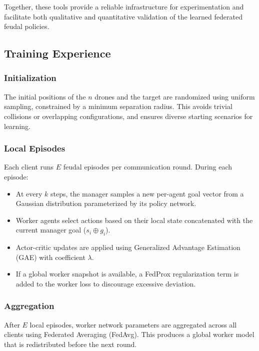 \documentclass[12pt,a4paper,twoside,openany]{book}
\begin{document}
Together, these tools provide a reliable infrastructure for experimentation and facilitate both qualitative and quantitative validation of the learned federated feudal policies.

\subsection{Training Experience}

\subsubsection{Initialization}
The initial positions of the $n$ drones and the target are randomized using uniform sampling, constrained by a minimum separation radius. This avoids trivial collisions or overlapping configurations, and ensures diverse starting scenarios for learning.

\subsubsection{Local Episodes}
Each client runs $E$ feudal episodes per communication round. During each episode:
\begin{itemize}
  \item At every $k$ steps, the manager samples a new per-agent goal vector from a Gaussian distribution parameterized by its policy network.
  \item Worker agents select actions based on their local state concatenated with the current manager goal ($s_i \oplus g_i$).
  \item Actor-critic updates are applied using Generalized Advantage Estimation (GAE) with coefficient $\lambda$.
  \item If a global worker snapshot is available, a FedProx regularization term is added to the worker loss to discourage excessive deviation.
\end{itemize}

\subsubsection{Aggregation}
After $E$ local episodes, worker network parameters are aggregated across all clients using Federated Averaging (FedAvg). This produces a global worker model that is redistributed before the next round.
\end{document}
